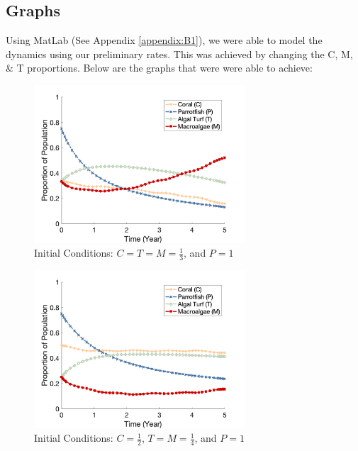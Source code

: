 \documentclass[12pt]{article}
\begin{document}
\subsection{Graphs}
Using MatLab (See Appendix \ref{appendix:B1}), we were able to model the dynamics using our preliminary rates. This was achieved by changing the C, M, \& T proportions. Below are the graphs that were were able to achieve:\\
\begin{figure}[H]
    \centering
    \includegraphics[width=0.7\textwidth]{Latex/Figures/Graphs/0.3C_0.3T_0.3M.png}
    \caption{Initial Conditions: $C = T = M = \frac{1}{3}$, and $P = 1$}
    \label{fig:initial_plot}
\end{figure}
\begin{figure}[H]
    \centering
    \includegraphics[width=0.7\textwidth]{Latex/Figures/Graphs/0.5C_0.25T_0.25M.png}
    \caption{Initial Conditions: $C = \frac{1}{2}$, $T = M = \frac{1}{4}$, and $P = 1$}
    \label{fig:coral_dominant}
\end{figure}
\end{document}
